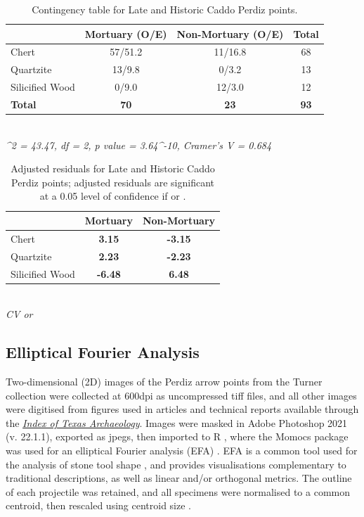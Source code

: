 \documentclass[review]{elsarticle}
\begin{document}
\begin{table}[tbh]\centering
\footnotesize
\caption{Contingency table for Late and Historic Caddo Perdiz points.}
\centering
\begin{tabular}{lccc}
\hline
 & Mortuary (O/E) & Non-Mortuary (O/E) & Total\\
\hline
Chert & 57/51.2 & 11/16.8 & 68\\
Quartzite & 13/9.8 & 0/3.2 & 13\\
Silicified Wood & 0/9.0 & 12/3.0 & 12\\
\hline
\textbf{Total} & \textbf{70} & \textbf{23} & \textbf{93}\\
\hline
\end{tabular}\\
\textit{\chi^{2} = 43.47, df = 2, p value = 3.64^{-10}, Cramer’s V  = 0.684}
\label{tab:Tbl3}
\end{table}

\begin{table}[tbh]\centering
\footnotesize
\caption{Adjusted residuals for Late and Historic Caddo Perdiz points; adjusted residuals are significant at a 0.05 level of confidence if \textbf{} or \textbf{}.}
\centering
\begin{tabular}{lcc}
\hline
 & Mortuary & Non-Mortuary\\
\hline
Chert & \textbf{3.15} & \textbf{-3.15}\\
Quartzite & \textbf{2.23} & \textbf{-2.23}\\
Silicified Wood & \textbf{-6.48} & \textbf{6.48}\\
\hline
\end{tabular}\\
\textit{CV  or }
\label{tab:Tbl4}
\end{table}

\subsection*{Elliptical Fourier Analysis}

Two-dimensional (2D) images of the Perdiz arrow points from the Turner collection were collected at 600dpi as uncompressed tiff files, and all other images were digitised from figures used in articles and technical reports available through the \href{https://scholarworks.sfasu.edu/ita/}{\textit{Index of Texas Archaeology}}. Images were masked in Adobe Photoshop 2021 (v. 22.1.1), exported as jpegs, then imported to R \citep{RN8584}, where the Momocs package was used for an elliptical Fourier analysis (EFA) \citep{RN8925}. EFA is a common tool used for the analysis of stone tool shape \citep{RN2805,RN9003,RN6313,RN5230,RN5225,RN5227,RN8358,RN8967,RN5231,RN7164}, and provides visualisations complementary to traditional descriptions, as well as linear and/or orthogonal metrics. The outline of each projectile was retained, and all specimens were normalised to a common centroid, then rescaled using centroid size \citep{RN8923}. 
\end{document}
